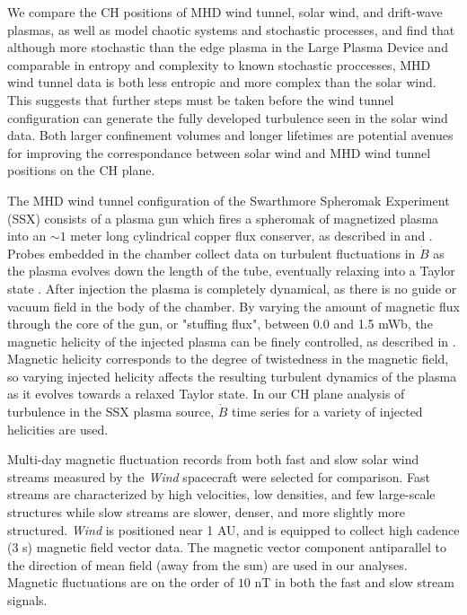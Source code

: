 \documentclass[aps,twocolumn,secnumarabic,nobalancelastpage,amsmath,amssymb,
nofootinbib]{revtex4-1}
\begin{document}
We compare the CH positions of MHD wind tunnel, solar wind, and drift-wave plasmas, as well as model chaotic systems and stochastic processes, and find that although more stochastic than the edge plasma in the Large Plasma Device and comparable in entropy and complexity to known stochastic proccesses, MHD wind tunnel data is both less entropic and more complex than the solar wind. This suggests that further steps must be taken before the wind tunnel configuration can generate the fully developed turbulence seen in the solar wind data. Both larger confinement volumes and longer lifetimes are potential avenues for improving the correspondance between  solar wind and MHD wind tunnel positions on the CH plane.

The MHD wind tunnel configuration of the Swarthmore Spheromak Experiment (SSX) consists of a plasma gun which fires a spheromak of magnetized plasma into an $\sim1$ meter long cylindrical copper flux conserver, as described in \cite{zhang2011} and \cite{schaffner2014}. Probes embedded in the chamber collect data on turbulent fluctuations in $\dot{B}$ as the plasma evolves down the length of the tube, eventually relaxing into a Taylor state \cite{gray2013}. After injection the plasma is completely dynamical, as there is no guide or vacuum field in the body of the chamber. By varying the amount of magnetic flux through the core of the gun, or "stuffing flux", between 0.0 and 1.5 mWb, the magnetic helicity of the injected plasma can be finely controlled, as described in \cite{schaffner2014}. Magnetic helicity corresponds to the degree of twistedness in the magnetic field, so varying injected helicity affects the resulting turbulent dynamics of the plasma as it evolves towards a relaxed Taylor state. In our CH plane analysis of turbulence in the SSX plasma source, $\dot{B}$ time series for a variety of injected helicities are used. 

 Multi-day magnetic fluctuation records from both fast and slow solar wind streams measured by the \textit{Wind} spacecraft were selected for comparison. Fast streams are characterized by high velocities, low densities, and  few large-scale structures while slow streams are slower, denser, and more slightly more structured. \textit{Wind} is positioned near 1 AU, and is equipped to collect high cadence (3 s) magnetic field vector data.   The magnetic vector component antiparallel to the direction of mean field (away from the sun) are used in our analyses. Magnetic fluctuations are on the order of $10$ nT in both the fast and slow stream signals. 
\end{document}
